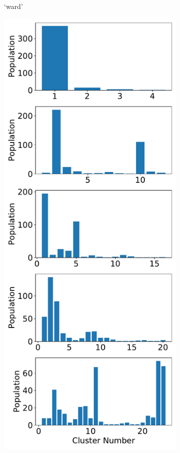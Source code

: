 \documentclass{article}
\begin{document}
\begin{figure}
\begin{subfigure}{0.24\textwidth}
  \caption{`ward'}\label{fig:nclusters_ward}
  \end{subfigure}
  \begin{subfigure}{0.24\textwidth}
  \includegraphics[width=\textwidth]{nclusters_complete.pdf}

\end{subfigure}
\end{figure}
\end{document}
